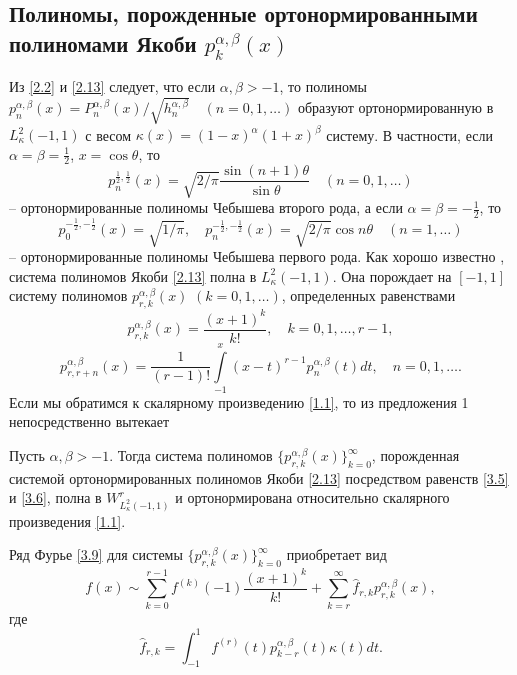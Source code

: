 \subsection{Полиномы, порожденные  ортонормированными полиномами Якоби $p_{k}^{\alpha,\beta}(x)$}


Из \eqref{2.2} и \eqref{2.13} следует, что если $\alpha,\beta>-1$, то полиномы $p_n^{\alpha,\beta}(x)=P_n^{\alpha,\beta}(x)/\sqrt{ h_n^{\alpha,\beta}}\quad(n=0,1,\ldots)$
образуют ортонормированную  в $L_\kappa^2(-1,1)$ с весом $\kappa(x)=(1-x)^\alpha(1+x)^\beta$ систему. В частности, если $\alpha=\beta=\frac12$, $x=\cos\theta$, то
$$
 p_n^{\frac12,\frac12}(x)=\sqrt{2/\pi}\frac{\sin(n+1)\theta}{\sin\theta}\quad (n=0,1,\ldots)
 $$
 -- ортонормированные полиномы Чебышева второго рода, а если $\alpha=\beta=-\frac12$, то
\begin{equation}\label{3.25}
p_0^{-\frac12,-\frac12}(x)=\sqrt{1/\pi},\quad  p_n^{-\frac12,-\frac12}(x)=\sqrt{2/\pi}\cos n\theta\quad (n=1,\ldots)
\end{equation}
 -- ортонормированные полиномы Чебышева первого рода.
 Как хорошо известно \cite{Sege}, система полиномов Якоби \eqref{2.13} полна в $L_\kappa^2(-1,1)$.   Она порождает на $[-1,1]$ систему полиномов  $p_{r,k}^{\alpha,\beta}(x)$ $(k=0,1,\ldots)$, определенных равенствами
   \begin{equation}\label{3.26}
p_{r,k}^{\alpha,\beta}(x) =\frac{(x+1)^k}{k!}, \quad k=0,1,\ldots, r-1,
\end{equation}
  \begin{equation}\label{3.27}
p_{r,r+n}^{\alpha,\beta}(x) =\frac{1}{(r-1)!}\int\limits_{-1}^x(x-t)^{r-1}p_n^{\alpha,\beta}(t)dt, \quad n=0,1,\ldots.
\end{equation}
Если мы обратимся к скалярному произведению \eqref{1.1}, то из предложения 1 непосредственно вытекает
\begin{corollary}
Пусть $\alpha,\beta>-1$. Тогда система полиномов $\{p_{r,k}^{\alpha,\beta}(x)\}_{k=0}^\infty$, порожденная системой ортонормированных полиномов Якоби \eqref{2.13} посредством равенств \eqref{3.5} и \eqref{3.6}, полна  в $W^r_{L^2_\kappa(-1,1)}$ и ортонормирована относительно скалярного произведения \eqref{1.1}.
\end{corollary}
Ряд Фурье \eqref{3.9} для системы   $\{p_{r,k}^{\alpha,\beta}(x)\}_{k=0}^\infty$ приобретает вид
\begin{equation}\label{3.28}
f(x)\sim \sum_{k=0}^{r-1} f^{(k)}(-1)\frac{(x+1)^k}{k!}+ \sum_{k=r}^\infty \hat f_{r,k}p_{r,k}^{\alpha,\beta}(x),
\end{equation}
где
  \begin{equation}\label{3.29}
 \hat f_{r,k}=\int_{-1}^1 f^{(r)}(t)p_{k-r}^{\alpha,\beta}(t)\kappa(t)dt.
\end{equation}

